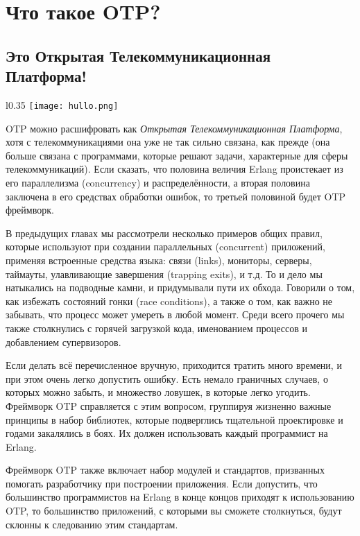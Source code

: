 \chapter{Что такое OTP?}
\label{what-is-otp}
\section{Это Открытая Телекоммуникационная Платформа!}
\label{its-the-open-telecom-platform}

\begin{wrapfigure}{l}{0.35\linewidth}
    \texttt{[image: hullo.png]}
\end{wrapfigure}
OTP можно расшифровать как \emph{Открытая Телекоммуникационная Платформа}, хотя с телекоммуникациями она уже не так сильно связана, как прежде (она больше связана с программами, которые решают задачи, характерные для сферы телекоммуникаций).
Если сказать, что половина величия Erlang проистекает из его параллелизма (concurrency) и распределённости, а вторая половина заключена в его средствах обработки ошибок, то третьей половиной будет OTP фреймворк.

В предыдущих главах мы рассмотрели несколько примеров общих правил, которые используют при создании параллельных (concurrent) приложений, применяя встроенные средства языка: связи (links), мониторы, серверы, таймауты, улавливающие завершения (trapping exits), и т.д.
То и дело мы натыкались на подводные камни, и придумывали пути их обхода.
Говорили о том, как избежать состояний гонки (race conditions), а также о том, как важно не забывать, что процесс может умереть в любой момент.
Среди всего прочего мы также столкнулись с горячей загрузкой кода, именованием процессов и добавлением супервизоров.

Если делать всё перечисленное вручную, приходится тратить много времени, и при этом очень легко допустить ошибку.
Есть немало граничных случаев, о которых можно забыть, и множество ловушек, в которые легко угодить.
Фреймворк OTP справляется с этим вопросом, группируя жизненно важные принципы в набор библиотек, которые подверглись тщательной проектировке и годами закалялись в боях.
Их должен использовать каждый программист на Erlang.

Фреймворк OTP также включает набор модулей и стандартов, призванных помогать разработчику при построении приложения.
Если допустить, что большинство программистов на Erlang в конце концов приходят к использованию OTP, то большинство приложений, с которыми вы сможете столкнуться, будут склонны к следованию этим стандартам. 
